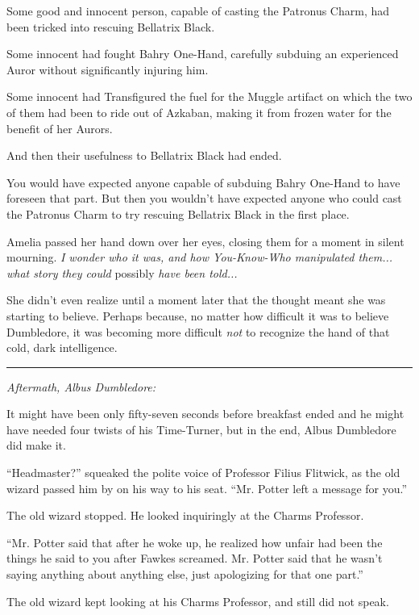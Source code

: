Some good and innocent person, capable of casting the Patronus Charm, had been tricked into rescuing Bellatrix Black.

Some innocent had fought Bahry One-Hand, carefully subduing an experienced Auror without significantly injuring him.

Some innocent had Transfigured the fuel for the Muggle artifact on which the two of them had been to ride out of Azkaban, making it from frozen water for the benefit of her Aurors.

And then their usefulness to Bellatrix Black had ended.

You would have expected anyone capable of subduing Bahry One-Hand to have foreseen that part. But then you wouldn't have expected anyone who could cast the Patronus Charm to try rescuing Bellatrix Black in the first place.

Amelia passed her hand down over her eyes, closing them for a moment in silent mourning. \emph{I wonder who it was, and how You-Know-Who manipulated them... what story they could} possibly \emph{have been told...}

She didn't even realize until a moment later that the thought meant she was starting to believe. Perhaps because, no matter how difficult it was to believe Dumbledore, it was becoming more difficult \emph{not} to recognize the hand of that cold, dark intelligence.

\begin{center}\rule{3in}{0.4pt}\end{center}

\emph{Aftermath, Albus Dumbledore:}

It might have been only fifty-seven seconds before breakfast ended and he might have needed four twists of his Time-Turner, but in the end, Albus Dumbledore did make it.

``Headmaster?'' squeaked the polite voice of Professor Filius Flitwick, as the old wizard passed him by on his way to his seat. ``Mr. Potter left a message for you.''

The old wizard stopped. He looked inquiringly at the Charms Professor.

``Mr. Potter said that after he woke up, he realized how unfair had been the things he said to you after Fawkes screamed. Mr. Potter said that he wasn't saying anything about anything else, just apologizing for that one part.''

The old wizard kept looking at his Charms Professor, and still did not speak.

